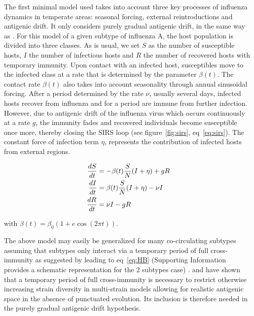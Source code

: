 The first minimal model used takes into account three key processes of
influenza dynamics in temperate areas: seasonal forcing, external
reintroductions and antigenic drift. It only considers purely gradual
antigenic drift, in the same way as \citet{Pease1987}. For this model
of a given subtype of influenza A, the host population is divided into
three classes. As is usual, we set $S$ as the number of susceptible
hosts, $I$ the number of infectious hosts and $R$ the number of
recovered hosts with temporary immunity. Upon contact with an infected
host, susceptibles move to the infected class at a rate that is
determined by the parameter $\beta(t)$. The contact rate $\beta(t)$
also takes into account seasonality through annual sinusoidal
forcing. After a period determined by the rate $\nu$, usually several
days, infected hosts recover from influenza and for a period are
immune from further infection. However, due to antigenic drift of the
influenza virus which occurs continuously at a rate $g$, the immunity
fades and recovered individuals become susceptible once more, thereby
closing the SIRS loop (see figure~\ref{fig:sirs},
eq~\eqref{eq:sirs}). The constant force of infection term $\eta$,
represents the contribution of infected hosts from external regions.

\begin{footnotesize}
  \begin{align}
    \label{eq:sirs}
    \frac{dS}{dt} &=-\beta(t) \frac{S}{N} (I+\eta) +g R \\
    \frac{dI}{dt} &= \beta(t)  \frac{S}{N} (I+\eta) -\nu I  \notag \\
    \frac{dR}{dt} &= \nu I -g R \notag
  \end{align}
\end{footnotesize}
with $\beta(t)=\beta_0 (1+e \cos(2 \pi t))$.

The above model may easily be generalized for many co-circulating
subtypes assuming that subtypes only interact via a temporary period
of full cross-immunity as suggested by \citet{Webster1992} leading to
eq~\eqref{eq:HB} (Supporting Information provides a schematic
representation for the 2 subtypes case) . \citet{Ferguson2003} and
\citet{Tria2005} have shown that a temporary period of full
cross-immunity is necessary to restrict otherwise increasing strain
diversity in multi-strain models allowing for realistic antigenic
space in the absence of punctuated evolution. Its inclusion is
therefore needed in the purely gradual antigenic drift hypothesis.

